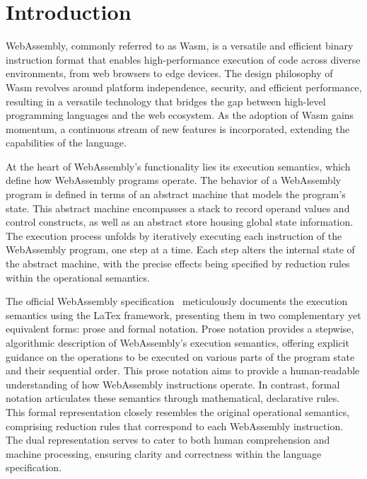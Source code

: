 \section{Introduction}\label{sec:intro}

WebAssembly, commonly referred to as Wasm, is a versatile and efficient
binary instruction format that enables high-performance execution of code
across diverse environments, from web browsers to edge devices. The design
philosophy of Wasm revolves around platform independence, security, and
efficient performance, resulting in a versatile technology that bridges the gap
between high-level programming languages and the web ecosystem. As the adoption
of Wasm gains momentum, a continuous stream of new features is incorporated,
extending the capabilities of the language.

At the heart of WebAssembly's functionality lies its execution semantics, which
define how WebAssembly programs operate. The behavior of a WebAssembly program
is defined in terms of an abstract machine that models the program's state.
This abstract machine encompasses a stack to record operand values and control
constructs, as well as an abstract store housing global state information. The
execution process unfolds by iteratively executing each instruction of the
WebAssembly program, one step at a time. Each step alters the internal state of
the abstract machine, with the precise effects being specified by reduction
rules within the operational semantics.

The official WebAssembly specification~\cite{wasmspec} meticulously documents
the execution semantics using the LaTex framework, presenting them in two
complementary yet equivalent forms: prose and formal notation. Prose notation
provides a stepwise, algorithmic description of WebAssembly's execution
semantics, offering explicit guidance on the operations to be executed on
various parts of the program state and their sequential order. This prose
notation aims to provide a human-readable understanding of how WebAssembly
instructions operate.  In contrast, formal notation articulates these semantics
through mathematical, declarative rules. This formal representation closely
resembles the original operational semantics, comprising reduction rules that
correspond to each WebAssembly instruction. The dual representation serves to
cater to both human comprehension and machine processing, ensuring clarity and
correctness within the language specification.

